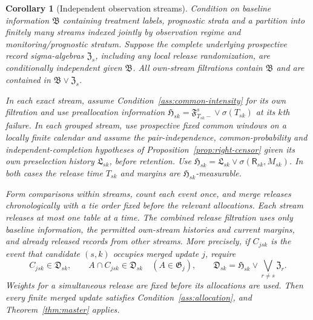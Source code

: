 \documentclass[12pt]{article}
\newtheorem{corollary}[theorem]{Corollary}
\theoremstyle{definition}
\theoremstyle{remark}
\begin{document}
\begin{corollary}[Independent observation streams]
\label{cor:mixed-streams}
Condition on baseline information $\mathfrak B$ containing treatment labels, prognostic strata and a partition into finitely many streams indexed jointly by observation regime and monitoring/prognostic stratum. Suppose the complete underlying prospective record sigma-algebras $\mathfrak Z_s$, including any local release randomization, are conditionally independent given $\mathfrak B$. All own-stream filtrations contain $\mathfrak B$ and are contained in $\mathfrak B\vee\mathfrak Z_s$.

In each exact stream, assume Condition~\ref{ass:common-intensity} for its own filtration and use preallocation information
$\mathfrak H_{sk}=\mathfrak F^s_{T_{sk}-}\vee\sigma(T_{sk})$ at its $k$th failure. In each grouped stream, use prospective fixed common windows on a locally finite calendar and assume the pair-independence, common-probability and independent-completion hypotheses of Proposition~\ref{prop:right-censor} given its own preselection history $\mathfrak L_{sk}$, before retention. Use $\mathfrak H_{sk}=\mathfrak L_{sk}\vee\sigma(\mathsf R_{sk},M_{sk})$. In both cases the release time $T_{sk}$ and margins are $\mathfrak H_{sk}$-measurable.

Form comparisons within streams, count each event once, and merge releases chronologically with a tie order fixed before the relevant allocations. Each stream releases at most one table at a time. The combined release filtration uses only baseline information, the permitted own-stream histories and current margins, and already released records from other streams. More precisely, if $C_{jsk}$ is the event that candidate $(s,k)$ occupies merged update $j$, require
\[
 C_{jsk}\in\mathfrak D_{sk},\qquad
 A\cap C_{jsk}\in\mathfrak D_{sk}\quad(A\in\mathfrak G_j),
 \qquad
 \mathfrak D_{sk}=\mathfrak H_{sk}\vee\bigvee_{r\ne s}\mathfrak Z_r.
\]
Weights for a simultaneous release are fixed before its allocations are used. Then every finite merged update satisfies Condition~\ref{ass:allocation}, and Theorem~\ref{thm:master} applies.
\end{corollary}
\end{document}
